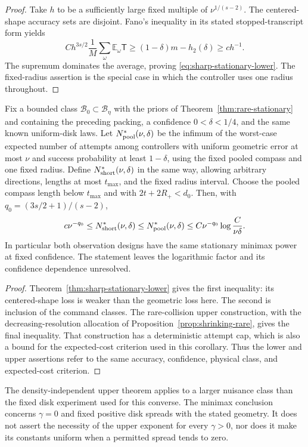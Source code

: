 \begin{proof}
Take $h$ to be a sufficiently large fixed multiple of
$\nu^{1/(s-2)}$. The centered-shape accuracy sets are disjoint.
Fano's inequality in its stated stopped-transcript form yields
\[
 C h^{3s/2}\frac1M\sum_\omega\mathbb E_\omega\mathsf T
    \ge (1-\delta)m-h_2(\delta)\ge c h^{-1}.
\]
The supremum dominates the average, proving
\eqref{eq:sharp-stationary-lower}. The fixed-radius assertion is
the special case in which the controller uses one radius throughout.
\end{proof}



\begin{corollary}
\label{cor:stationary-minimax}
Fix a bounded class $\mathcal B_0\subset\mathcal B_\eta$ with the
priors of Theorem~\ref{thm:rare-stationary} and containing the preceding
packing, a confidence
$0<\delta<1/4$, and the same known uniform-disk laws. Let
$N^*_{\rm pool}(\nu,\delta)$ be the infimum of the worst-case
expected number of attempts among controllers with uniform geometric
error at most $\nu$ and success probability at least $1-\delta$,
using the fixed pooled compass and one fixed radius. Define
$N^*_{\rm short}(\nu,\delta)$ in the same way, allowing arbitrary
directions, lengths at most $t_{\max}$, and the fixed radius interval.
Choose the pooled compass length below $t_{\max}$ and with
$2t+2R_+<d_0$. Then, with
$q_0=(3s/2+1)/(s-2)$,
\begin{equation}\label{eq:stationary-sharp-bracket}
 c\nu^{-q_0}
 \le N^*_{\rm short}(\nu,\delta)
 \le N^*_{\rm pool}(\nu,\delta)
 \le C\nu^{-q_0}\log\frac{C}{\nu\delta}.
\end{equation}
In particular both observation designs have the same stationary
minimax power at fixed confidence. The statement leaves the
logarithmic factor and its confidence dependence unresolved.
\end{corollary}
\begin{proof}
Theorem~\ref{thm:sharp-stationary-lower} gives the first inequality:
its centered-shape loss is weaker than the geometric loss here.
The second is inclusion of the command classes. The rare-collision
upper construction, with the decreasing-resolution allocation of
Proposition~\ref{prop:shrinking-rare}, gives the final inequality.
That construction has a deterministic attempt cap, which is also a
bound for the expected-cost criterion used in this corollary.
Thus the lower and upper assertions refer to the same accuracy,
confidence, physical class, and expected-cost criterion.
\end{proof}

The density-independent upper theorem applies to a larger nuisance
class than the fixed disk experiment used for this converse. The
minimax conclusion concerns $\gamma=0$ and fixed positive disk
spreads with the stated geometry. It does not assert the necessity
of the upper exponent for every $\gamma>0$, nor does it make its
constants uniform when a permitted spread tends to zero.
